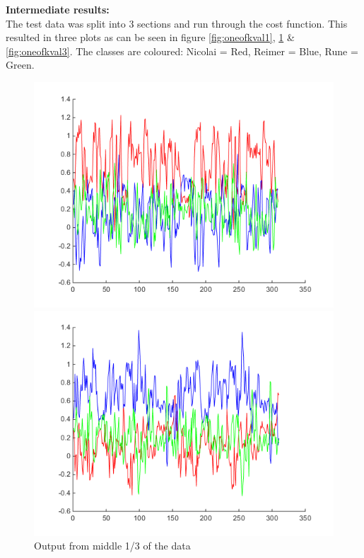 \textbf{Intermediate results:}\\
The test data was split into 3 sections and run through the cost function. This resulted in three plots as can be seen in figure \ref{fig:oneofkval1}, \ref{fig:oneofkval2} \& \ref{fig:oneofkval3}. The classes are coloured: Nicolai = Red, Reimer = Blue, Rune = Green.
\begin{figure}[H]
  \includegraphics[width=\linewidth]{billeder/oneofkval1}
  \caption{Output from first 1/3 of the data}\label{fig:oneofkval1}
\endminipage\hfill
{}
  \includegraphics[width=\linewidth]{billeder/oneofkval2}
  \caption{Output from middle 1/3 of the data}\label{fig:oneofkval2}
\endminipage\hfill

\end{figure}
